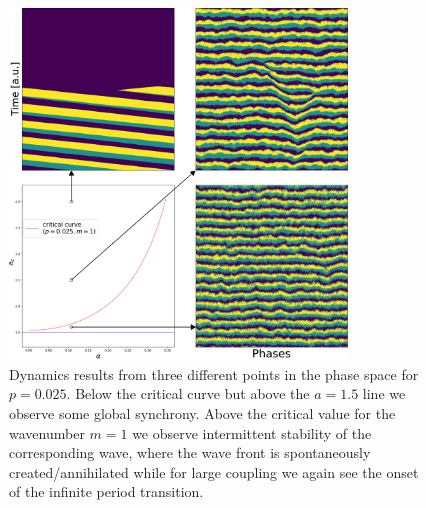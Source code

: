 \begin{figure}
  \centering
  \includegraphics[width=0.8\textwidth]{fig/chap4/crit_plane_sample2.png}
	\caption{
		Dynamics results from three different points in the phase space for $p=0.025$. Below the critical curve but above the $a=1.5$ line
		we observe some global synchrony. Above the critical value for the wavenumber $m=1$ we observe intermittent stability of the
		corresponding wave, where the wave front is spontaneously created/annihilated while for large coupling we again see the onset of
		the infinite period transition.
	}
	\label{fig:critical_plane_sample2}
\end{figure}

